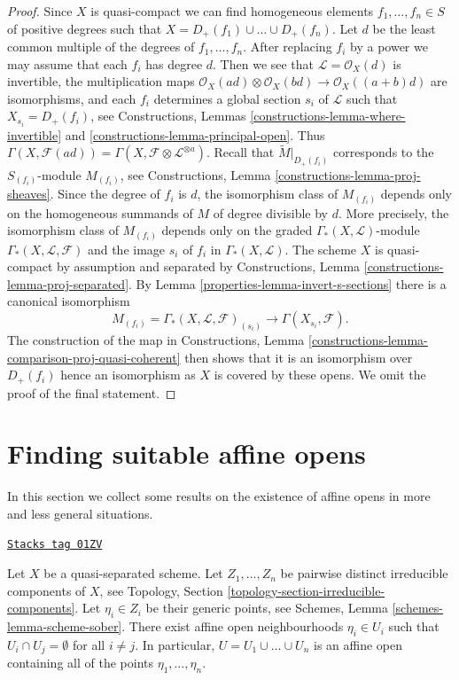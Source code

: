 \begin{proof}

Since $X$ is quasi-compact we can find homogeneous elements
$f_1, \ldots, f_n \in S$ of positive degrees such that
$X = D_+(f_1) \cup \ldots \cup D_+(f_n)$. Let $d$ be the
least common multiple of the degrees of $f_1, \ldots, f_n$.
After replacing $f_i$ by a power we may assume that each
$f_i$ has degree $d$. Then we see that $\mathcal{L} = \mathcal{O}_X(d)$ is
invertible, the multiplication maps
$\mathcal{O}_X(ad) \otimes \mathcal{O}_X(bd) \to \mathcal{O}_X((a + b)d)$
are isomorphisms, and each $f_i$ determines a global section $s_i$
of $\mathcal{L}$ such that $X_{s_i} = D_+(f_i)$, see
Constructions, Lemmas \ref{constructions-lemma-where-invertible} and
\ref{constructions-lemma-principal-open}.
Thus $\Gamma(X, \mathcal{F}(ad)) =
\Gamma(X, \mathcal{F} \otimes \mathcal{L}^{\otimes a})$.
Recall that $\widetilde{M}|_{D_{+}(f_i)}$ corresponds to the
$S_{(f_i)}$-module $M_{(f_i)}$, see
Constructions, Lemma \ref{constructions-lemma-proj-sheaves}.
Since the degree of $f_i$ is $d$, the isomorphism class of
$M_{(f_i)}$ depends only on the homogeneous summands of $M$ of
degree divisible by $d$. More precisely, the isomorphism class of
$M_{(f_i)}$ depends only on the graded $\Gamma_*(X, \mathcal{L})$-module
$\Gamma_*(X, \mathcal{L}, \mathcal{F})$
and the image $s_i$ of $f_i$ in $\Gamma_*(X, \mathcal{L})$.
The scheme $X$ is quasi-compact by assumption and
separated by Constructions, Lemma \ref{constructions-lemma-proj-separated}.
By Lemma \ref{properties-lemma-invert-s-sections} there is a canonical isomorphism
$$
M_{(f_i)} = \Gamma_*(X, \mathcal{L}, \mathcal{F})_{(s_i)} \to
\Gamma(X_{s_i}, \mathcal{F}).
$$
The construction of the map in Constructions, Lemma
\ref{constructions-lemma-comparison-proj-quasi-coherent}
then shows that it is an isomorphism over $D_+(f_i)$
hence an isomorphism as $X$ is covered by these opens.
We omit the proof of the final statement.
\end{proof}

\section{Finding suitable affine opens}
\label{properties-section-finding-affine-opens}
In this section we collect some results on the existence of
affine opens in more and less general situations.

\begin{lemma}
\label{properties-lemma-maximal-points-affine}
\href{https://stacks.math.columbia.edu/tag/01ZV}{\texttt{Stacks tag 01ZV}}

Let $X$ be a quasi-separated scheme.
Let $Z_1, \ldots, Z_n$ be pairwise distinct irreducible components of $X$,
see Topology, Section \ref{topology-section-irreducible-components}.
Let $\eta_i \in Z_i$ be their generic points, see
Schemes, Lemma \ref{schemes-lemma-scheme-sober}.
There exist affine open neighbourhoods $\eta_i \in U_i$
such that $U_i \cap U_j = \emptyset$ for all $i \not = j$.
In particular, $U = U_1 \cup \ldots \cup U_n$ is an affine
open containing all of the points $\eta_1, \ldots, \eta_n$.
\end{lemma}

